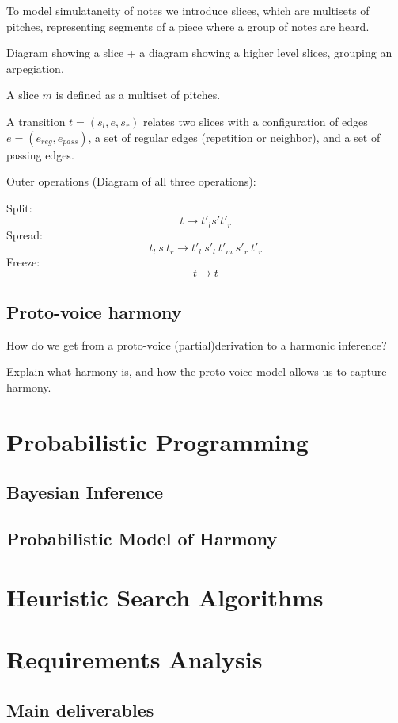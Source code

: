 \documentclass[12pt,a4paper,twoside,openright]{report}
\begin{document}
To model simulataneity of notes we introduce slices, which are multisets of pitches, representing segments of a piece where a group of notes are heard. 
\par 
Diagram showing a slice + a diagram showing a higher level slices, grouping an arpegiation.
\par 
A slice $m$ is defined as a multiset of pitches.
\par 
A transition $t = (s_l, e, s_r)$  relates two slices with a configuration of edges $e=(e_{reg}, e_{pass})$, a set of regular edges (repetition or neighbor), and a set of passing edges.
\par
Outer operations (Diagram of all three operations): 
\par
Split: \[t \to t'_l s' t'_r\]
Spread: \[t_l~s~t_r \to t'_l~s'_l~t'_m~s'_r~t'_r\]
Freeze: \[t \to t \]

\subsection{Proto-voice harmony}
How do we get from a proto-voice (partial)derivation to a harmonic inference?
\par
Explain what harmony is, and how the proto-voice model allows us to capture harmony. 


\section{Probabilistic Programming}

\subsection{Bayesian Inference}

\subsection{Probabilistic Model of Harmony}

\section{Heuristic Search Algorithms}

\section{Requirements Analysis}

\subsection{Main deliverables}
\end{document}
